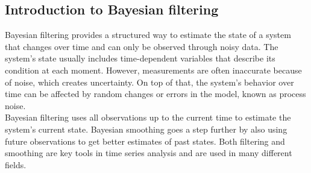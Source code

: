 \subsection{Introduction to Bayesian filtering}
Bayesian filtering provides a structured way to estimate the state of a system that changes over time and can only be observed through noisy data. The system’s state usually includes time-dependent variables that describe its condition at each moment. However, measurements are often inaccurate because of noise, which creates uncertainty. On top of that, the system’s behavior over time can be affected by random changes or errors in the model, known as process noise.
\\
Bayesian filtering uses all observations up to the current time to estimate the system’s current state. Bayesian smoothing goes a step further by also using future observations to get better estimates of past states. Both filtering and smoothing are key tools in time series analysis and are used in many different fields.



